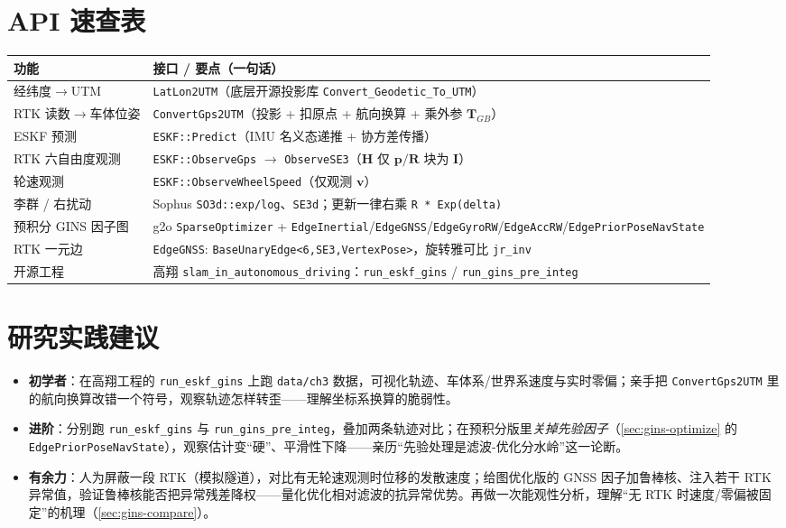\section*{API 速查表}
\begin{table}[H]\centering\small
\begin{tabular}{p{} p{}}
\toprule
功能 & 接口 / 要点（一句话） \\
\midrule
经纬度$\to$UTM & \texttt{LatLon2UTM}（底层开源投影库 \texttt{Convert\_Geodetic\_To\_UTM}） \\
RTK 读数$\to$车体位姿 & \texttt{ConvertGps2UTM}（投影 + 扣原点 + 航向换算 + 乘外参 $\mathbf{T}_{GB}$） \\
ESKF 预测 & \texttt{ESKF::Predict}（IMU 名义态递推 + 协方差传播） \\
RTK 六自由度观测 & \texttt{ESKF::ObserveGps} $\to$ \texttt{ObserveSE3}（$\mathbf{H}$ 仅 $\mathbf{p}/\mathbf{R}$ 块为 $\mathbf{I}$） \\
轮速观测 & \texttt{ESKF::ObserveWheelSpeed}（仅观测 $\mathbf{v}$） \\
李群 / 右扰动 & Sophus \texttt{SO3d::exp/log}、\texttt{SE3d}；更新一律右乘 \texttt{R * Exp(delta)} \\
预积分 GINS 因子图 & g2o \texttt{SparseOptimizer} + \texttt{EdgeInertial}/\texttt{EdgeGNSS}/\texttt{EdgeGyroRW}/\texttt{EdgeAccRW}/\texttt{EdgePriorPoseNavState} \\
RTK 一元边 & \texttt{EdgeGNSS}: \texttt{BaseUnaryEdge<6,SE3,VertexPose>}，旋转雅可比 \texttt{jr\_inv} \\
开源工程 & 高翔 \texttt{slam\_in\_autonomous\_driving}：\texttt{run\_eskf\_gins} / \texttt{run\_gins\_pre\_integ} \\
\bottomrule
\end{tabular}
\end{table}

\section*{研究实践建议}
\begin{itemize}
  \item \textbf{初学者}：在高翔工程的 \texttt{run\_eskf\_gins} 上跑 \texttt{data/ch3} 数据，可视化轨迹、车体系/世界系速度与实时零偏；亲手把 \texttt{ConvertGps2UTM} 里的航向换算改错一个符号，观察轨迹怎样转歪——理解坐标系换算的脆弱性。
  \item \textbf{进阶}：分别跑 \texttt{run\_eskf\_gins} 与 \texttt{run\_gins\_pre\_integ}，叠加两条轨迹对比；在预积分版里\emph{关掉先验因子}（\cref{sec:gins-optimize} 的 \texttt{EdgePriorPoseNavState}），观察估计变“硬”、平滑性下降——亲历“先验处理是滤波-优化分水岭”这一论断。
  \item \textbf{有余力}：人为屏蔽一段 RTK（模拟隧道），对比有无轮速观测时位移的发散速度；给图优化版的 GNSS 因子加鲁棒核、注入若干 RTK 异常值，验证鲁棒核能否把异常残差降权——量化优化相对滤波的抗异常优势。再做一次能观性分析，理解“无 RTK 时速度/零偏被固定”的机理（\cref{sec:gins-compare}）。
\end{itemize}

